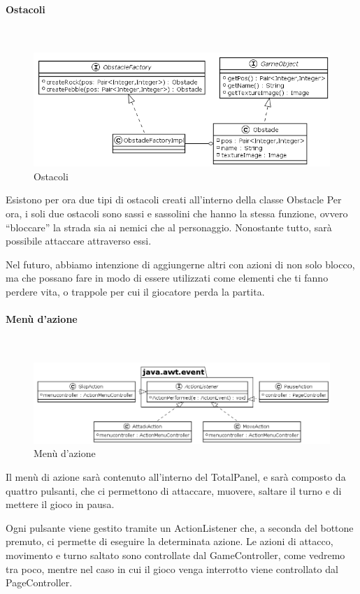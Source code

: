 \documentclass[a4paper,titlepage,12pt]{article}
\begin{document}
\paragraph{Ostacoli}
\par \noindent \\
\begin{figure}[H]
    \centering
    \includegraphics[scale=0.55]{img/uml/Obstacle.png}
    \caption{Ostacoli}
    \label{fig: Ostacoli}
\end{figure}
\par \noindent Esistono per ora due tipi di ostacoli creati all’interno della classe Obstacle
Per ora, i soli due ostacoli sono sassi e sassolini che hanno la stessa funzione, ovvero “bloccare” la strada sia ai nemici che al personaggio. Nonostante tutto, sarà possibile attaccare attraverso essi.
\par \noindent Nel futuro, abbiamo intenzione di aggiungerne altri con azioni di non solo blocco, ma che possano fare in modo di essere utilizzati come elementi che ti fanno perdere vita, o trappole per cui il giocatore perda la partita.

\paragraph{Menù d'azione}
\par \noindent \\
\begin{figure}[H]
    \centering
    \includegraphics[scale=0.5]{img/uml/ActionMenu.png}
    \caption{Menù d'azione}
    \label{fig: Menù d'azione}
\end{figure}
\par \noindent Il menù di azione sarà contenuto all’interno del TotalPanel, e sarà composto da quattro pulsanti, che ci permettono di attaccare, muovere, saltare il turno e di mettere il gioco in pausa.
\par \noindent Ogni pulsante viene gestito tramite un ActionListener che, a seconda del bottone premuto, ci permette di eseguire la determinata azione. Le azioni di attacco, movimento e turno saltato sono controllate dal GameController, come vedremo tra poco, mentre nel caso in cui il gioco venga interrotto viene controllato dal PageController.
\newpage
\end{document}
